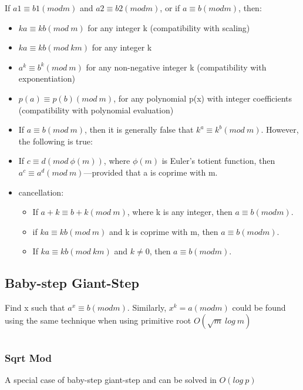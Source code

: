 If $a1 \equiv b1 (mod m)$ and $a2 \equiv b2 (mod m)$, or if $a \equiv b (mod m)$, then:
\begin{itemize}
    \item $ka \equiv kb (mod \ m)$ for any integer k (compatibility with scaling)
    \item $k a \equiv k b (mod \ km)$ for any integer k
    \item $a^k \equiv b^k (mod \ m)$ for any non-negative integer k (compatibility with exponentiation)
    \item $p(a) \equiv p(b) (mod \ m)$, for any polynomial p(x) with integer coefficients (compatibility with polynomial evaluation)
    \item If $a \equiv b (mod \ m)$, then it is generally false that $k^a \equiv k^b (mod \ m)$. However, the following is true:
    \item If $c \equiv d (mod \ \phi(m))$, where $\phi(m)$ is Euler's totient function, then $a^c \equiv a^d (mod \ m)$—provided that a is coprime with m.
    \item cancellation:
        \begin{itemize}
            \item If $a + k \equiv  b + k (mod \ m)$, where k is any integer, then $a \equiv b (mod m)$.
            \item if $ka \equiv kb (mod \ m)$ and k is coprime with m, then $a \equiv b (mod m)$.
            \item If $k a \equiv k b (mod \ km)$ and $k \neq 0$, then $a \equiv b (mod m)$.
        \end{itemize}

\end{itemize}

\subsection{Baby-step Giant-Step}
{Find x such that $a^x \equiv b (mod m)$.
Similarly, $x^k = a (mod m)$ could be found using the same technique when using primitive root}
{$O(\sqrt{m} \ log \ m)$}
\inputminted[]{cpp}{source/template/DiscreteLog.cpp}

\subsubsection{Sqrt Mod}
{A special case of baby-step giant-step and can be solved in $O(log \ p)$}
\inputminted[]{cpp}{source/template/sqrtmod.cpp}

